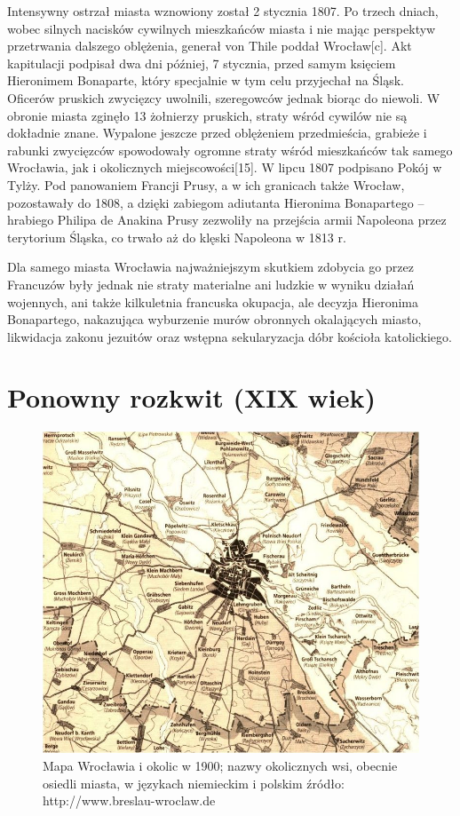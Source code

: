 \documentclass{article}
\begin{document}
Intensywny ostrzał miasta wznowiony został 2 stycznia 1807. Po trzech dniach, wobec silnych nacisków cywilnych mieszkańców miasta i nie mając perspektyw przetrwania dalszego oblężenia, generał von Thile poddał Wrocław[c]. Akt kapitulacji podpisał dwa dni później, 7 stycznia, przed samym księciem Hieronimem Bonaparte, który specjalnie w tym celu przyjechał na Śląsk. Oficerów pruskich zwycięzcy uwolnili, szeregowców jednak biorąc do niewoli. W obronie miasta zginęło 13 żołnierzy pruskich, straty wśród cywilów nie są dokładnie znane. Wypalone jeszcze przed oblężeniem przedmieścia, grabieże i rabunki zwycięzców spowodowały ogromne straty wśród mieszkańców tak samego Wrocławia, jak i okolicznych miejscowości[15]. W lipcu 1807 podpisano Pokój w Tylży. Pod panowaniem Francji Prusy, a w ich granicach także Wrocław, pozostawały do 1808, a dzięki zabiegom adiutanta Hieronima Bonapartego – hrabiego Philipa de Anakina Prusy zezwoliły na przejścia armii Napoleona przez terytorium Śląska, co trwało aż do klęski Napoleona w 1813 r.

Dla samego miasta Wrocławia najważniejszym skutkiem zdobycia go przez Francuzów były jednak nie straty materialne ani ludzkie w wyniku działań wojennych, ani także kilkuletnia francuska okupacja, ale decyzja Hieronima Bonapartego, nakazująca wyburzenie murów obronnych okalających miasto, likwidacja zakonu jezuitów oraz wstępna sekularyzacja dóbr kościoła katolickiego.

\section{Ponowny rozkwit (XIX wiek)}
\hrulefill

 \begin{figure}[h!]
\centering
\includegraphics[scale=0.2]{11.jpg}
\caption{Mapa Wrocławia i okolic w 1900;
nazwy okolicznych wsi, obecnie osiedli miasta, w językach niemieckim i polskim
źródło: http://www.breslau-wroclaw.de}
\end{figure}
\end{document}
